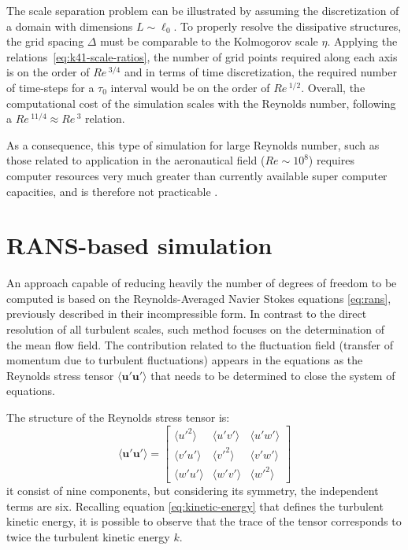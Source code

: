 \documentclass[12pt, a4paper, twoside, openright]{book}
\begin{document}
The scale separation problem can be illustrated by assuming the discretization of a domain with dimensions $L \sim \ell_0$. To properly resolve the dissipative structures, the grid spacing $\Delta$ must be comparable to the Kolmogorov scale $\eta$. Applying the relations~\eqref{eq:k41-scale-ratios}, the number of grid points required along each axis is on the order of $Re\,^{3/4}$ and in terms of time discretization, the required number of time-steps for a $\tau_0$ interval would be on the order of $Re\,^{1/2}$. Overall, the computational cost of the simulation scales with the Reynolds number, following a $Re\,^{11/4} \approx Re\,^3$ relation.

As a consequence, this type of simulation for large Reynolds number, such as those related to application in the aeronautical field ($Re \sim 10^8$) requires computer resources very much greater than currently available super computer capacities, and is therefore not practicable \cite{les-sagaut}.

\section{RANS-based simulation}
\label{sec:rans}

An approach capable of reducing heavily the number of degrees of freedom to be computed is based on the Reynolds-Averaged Navier Stokes equations \eqref{eq:rans}, previously described in their incompressible form. In contrast to the direct resolution of all turbulent scales, such method focuses on the determination of the mean flow field. The contribution related to the fluctuation field (transfer of momentum due to turbulent fluctuations) appears in the equations as the Reynolds stress tensor $\langle \bm{u}' \bm{u}' \rangle$ that needs to be determined to close the system of equations.

The structure of the Reynolds stress tensor is:
\begin{equation}
	\langle \bm{u}' \bm{u}' \rangle =
	\begin{bmatrix}
		\langle u'^2 \rangle & \langle u'v' \rangle & \langle u'w' \rangle \\
		\langle v'u' \rangle & \langle v'^2 \rangle & \langle v'w' \rangle \\
		\langle w'u' \rangle & \langle w'v' \rangle & \langle w'^2 \rangle
	\end{bmatrix}
	\label{eq:reynolds-stress-tensor}
\end{equation}
it consist of nine components, but considering its symmetry, the independent terms are six. Recalling equation \eqref{eq:kinetic-energy} that defines the turbulent kinetic energy, it is possible to observe that the trace of the tensor corresponds to twice the turbulent kinetic energy $k$.
\end{document}
